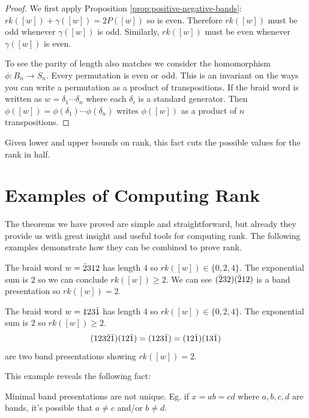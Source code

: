 \documentclass[12pt]{thesis}
\begin{document}
\begin{proof}
    We first apply Proposition \ref{prop:positive-negative-bands}:
    $rk([w]) + \gamma([w]) = 2P([w])$ so is even.
    Therefore $rk([w])$ must be odd whenever $\gamma([w])$ is odd.
    Similarly, $rk([w])$ must be even whenever $\gamma([w])$ is even.


    To see the parity of length also matches
    we consider the homomorphism $\phi \colon B_{n} \rightarrow S_{n}$.
    Every permutation is even or odd.
    This is an invariant on the ways you can write a
    permutation as a product of transpositions.
    If the braid word is written as $w = \delta_{1} \cdots \delta_{n}$
    where each $\delta_{i}$ is a standard generator.
    Then $\phi([w]) = \phi(\delta_{1}) \cdots \phi(\delta_{n})$ 
    writes $\phi([w])$ as a product of $n$ transpositions.
\end{proof}

Given lower and upper bounds on rank,
this fact cuts the possible values for the rank in half.

\section{Examples of Computing Rank}

The theorems we have proved are simple and straightforward,
but already they provide us with great
insight and useful tools for computing rank.
The following examples demonstrate how they
can be combined to prove rank.

\begin{example}
    The braid word $w = \bar{2} 3 1 2$ has length 4 so $rk([w]) \in \{ 0, 2, 4 \}$.
    The exponential sum is $2$ so we can conclude $rk([w]) \geq 2$.
    We can see $(\bar{2} 3 2) (\bar{2} 1 2)$ is a band presentation so $rk([w]) = 2$.
\end{example}

\begin{example}
    The braid word $w = 1 2 3 \bar{1}$ has length 4 so $rk([w]) \in \{ 0, 2, 4 \}$.
    The exponential sum is $2$ so $rk([w]) \geq 2$.
    \[
        (1 2 3 \bar{2} \bar{1}) (1 2 \bar{1}) = (1 2 3 \bar{1}) = (1 2 \bar{1}) (1 3 \bar{1})
    \]
    are two band presentations showing $rk([w]) = 2$.
\end{example}

This example reveals the following fact:

\begin{proposition}
    Minimal band presentations are not unique.
    Eg. if $x = ab = cd$  where $a, b, c, d$ are bands,
    it's possible that $a \neq c$ and/or $b \neq d$.
\end{proposition}
\end{document}
